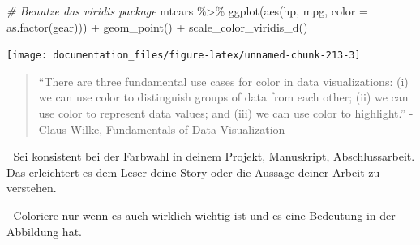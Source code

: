 \documentclass[
]{article}
\newenvironment{Shaded}{\begin{snugshade}}{\end{snugshade}}
\newcommand{\AttributeTok}[1]{\textcolor[rgb]{0.77,0.63,0.00}{#1}}
\newcommand{\CommentTok}[1]{\textcolor[rgb]{0.56,0.35,0.01}{\textit{#1}}}
\newcommand{\FunctionTok}[1]{\textcolor[rgb]{0.00,0.00,0.00}{#1}}
\newcommand{\NormalTok}[1]{#1}
\newcommand{\SpecialCharTok}[1]{\textcolor[rgb]{0.00,0.00,0.00}{#1}}
\begin{document}
\begin{Shaded}
\begin{Highlighting}[]
\CommentTok{\# Benutze das viridis package}
\NormalTok{mtcars }\SpecialCharTok{\%\textgreater{}\%}
  \FunctionTok{ggplot}\NormalTok{(}\FunctionTok{aes}\NormalTok{(hp, mpg, }\AttributeTok{color =} \FunctionTok{as.factor}\NormalTok{(gear))) }\SpecialCharTok{+}
  \FunctionTok{geom\_point}\NormalTok{() }\SpecialCharTok{+}
  \FunctionTok{scale\_color\_viridis\_d}\NormalTok{()}
\end{Highlighting}
\end{Shaded}

\begin{center}\texttt{[image: documentation\_files/figure-latex/unnamed-chunk-213-3]} \end{center}

\begin{quote}
``There are three fundamental use cases for color in data visualizations: (i) we can use color to distinguish groups of data from each other; (ii) we can use color to represent data values; and (iii) we can use color to highlight.'' - Claus Wilke, Fundamentals of Data Visualization
\end{quote}

🚨 Sei konsistent bei der Farbwahl in deinem Projekt, Manuskript, Abschlussarbeit. Das erleichtert es dem Leser deine Story oder die Aussage deiner Arbeit zu verstehen.

🚨 Coloriere nur wenn es auch wirklich wichtig ist und es eine Bedeutung in der Abbildung hat.
\end{document}
